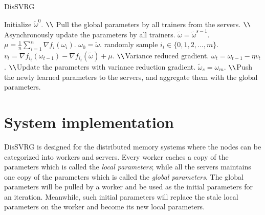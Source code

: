 \documentclass[preprint,review,11pt,a4paper]{elsarticle}
\begin{document}
\begin{algorithm}[t]
    \caption{DisSVRG}
    \label{algorithm_dis_svrg}
    \begin{algorithmic}[1]
        \State Initialize $\tilde{\omega}^0$. $ \verb|\\|$ Pull the global parameters by all trainers from the servers.
         $ \verb|\\|$ Asynchronously update the parameters by all trainers.
            \State $\tilde{\omega}=\tilde{\omega}^{s-1}$.
            \State $\mu=\frac{1}{n}\sum\limits_{i=1}^n\nabla f_i(\omega_i)$.
            \State $\omega_0=\tilde{\omega}$.
                \State randomly sample $i_t\in\{0,1,2,...,m\}$.
                \State $v_t=\nabla f_{i_t}(\omega_{t-1})-\nabla f_{i_t}(\tilde{\omega})+\mu$. $ \verb|\\|$Variance reduced gradient.
                \State $\omega_t=\omega_{t-1}-\eta v_t$. $ \verb|\\|$Update the parameters with variance reduction gradient.
           \EndFor
           \State $\tilde{\omega}_s=\omega_m$. $ \verb|\\|$Push the newly learned parameters to the servers, and aggregate them with the global parameters.
       \EndFor
    \end{algorithmic}
\end{algorithm}

%

\section{System implementation}
\label{implementation}
DisSVRG is designed for the distributed memory systems where the nodes can be categorized into workers and servers. Every worker caches a copy of the parameters which is called the \emph{local parameters}; while all the servers maintains one copy of the parameters which is called the \emph{global parameters}. The global parameters will be pulled by a worker and be used as the initial parameters for an iteration. Meanwhile, such initial parameters will replace the stale local parameters on the worker and become its new local parameters.
\end{document}
